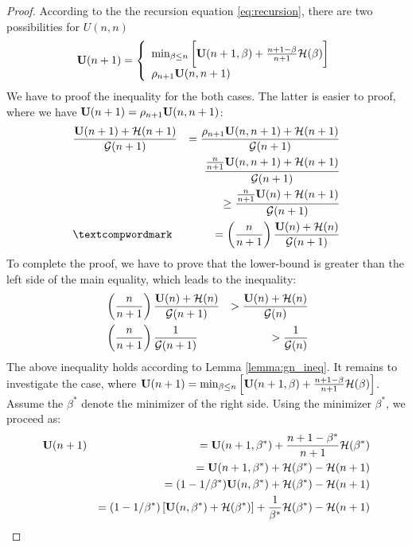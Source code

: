 \documentclass{article}
\begin{document}
\begin{proof}
	According to the the recursion equation \ref{eq:recursion}, there are two
	possibilities for $U(n,n)$
	\begin{equation*} 
	\mathbf U(n+1) = 
\left\{
	\begin{array}{ll}
		\min_{\beta \leq n} \bigg[\mathbf U(n+1,\beta) + \frac{n+1 - \beta}{n+1}
		{\cal H}(\beta) \bigg]\\
		\rho_{n+1} \mathbf U(n,n+1)
	\end{array}
\right.
\end{equation*}
We have to proof the inequality for the both cases. The latter is easier to
proof, where we have $\mathbf U(n+1) = \rho_{n+1} \mathbf U(n,n+1)$: 
\begin{eqnarray*}
	& \frac{\U(n+1)+\bound(n+1)}{\G(n+1)} &  = 
	\frac{\rho_{n+1} \U(n,n+1)+\bound(n+1)}{\G(n+1)}  \\
	& & \frac{\frac{n}{n+1} \U(n,n+1)+\bound(n+1)}{\G(n+1)} \\ 
	& & \geq  \frac{\frac{n}{n+1} \U(n)+\bound(n+1)}{\G(n+1)} \\
	&‌ & = \left( \frac{n}{n+1}\right) \frac{\U(n)+\bound(n)}{\G(n+1)}
\end{eqnarray*}
To complete the proof, we have to prove that the
lower-bound is greater than the left side of the main equality, which leads to
the inequality:
\begin{eqnarray*}
	& \left( \frac{n}{n+1}\right) \frac{\mathbf U(n)+{\cal H}(n)}{{\cal G}(n+1)} & > 
	\frac{\mathbf U(n)+{\cal H}(n)}{{\cal G}(n)} \\
	& \left( \frac{n}{n+1}\right) \frac{1}{{\cal G}(n+1)} & > 
	\frac{1}{{\cal G}(n)}
\end{eqnarray*}
The above inequality holds according to Lemma \ref{lemma:gn_ineq}. It remains to
investigate the case, where $\mathbf U(n+1) = \min_{\beta \leq n} \left[\mathbf U(n+1,\beta) +
\frac{n+1 - \beta}{n+1} {\cal H}(\beta) \right]$. Assume the $\beta^*$ denote the minimizer of the right side. 
Using the minimizer $\beta^*$, we proceed as:
\begin{eqnarray}
	& \mathbf U(n+1) & = \mathbf U(n+1,\beta^*) + \frac{n+1 - \beta^*}{n+1}
		{\cal H}(\beta^*) \nonumber\\ 
		&  & = \mathbf U(n+1,\beta^*) + {\cal H}(\beta^*) - {\cal H}(n+1) \nonumber\\ 
		& & = (1-1/\beta^*) \mathbf U(n,\beta^*) + {\cal H}(\beta^*) - {\cal H}(n+1) \nonumber\\ 
		& & = (1-1/\beta^*) \left[ \mathbf U(n,\beta^*) + {\cal H}(\beta^*) \right] +
		\frac{1}{\beta^*} {\cal H}(\beta^*) - {\cal H}(n+1) \label{eq:unplusone}
\end{eqnarray} 

\end{proof}
\end{document}
